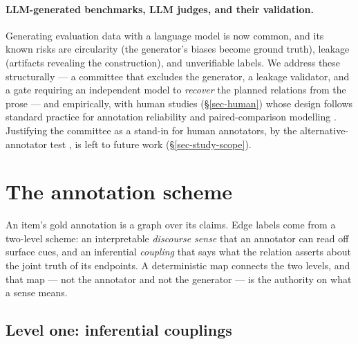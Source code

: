 \paragraph{LLM-generated benchmarks, LLM judges, and their validation.} Generating evaluation data with a
language model is now common, and its known risks are circularity (the generator's biases become ground
truth), leakage (artifacts revealing the construction), and unverifiable labels. We address these
structurally --- a committee that excludes the generator, a leakage validator, and a gate requiring an
independent model to \emph{recover} the planned relations from the prose --- and empirically, with human
studies (\S\ref{sec-human}) whose design follows standard practice for annotation reliability
\citep{krippendorff} and paired-comparison modelling \citep{bradleyterry}. Justifying the committee as a
stand-in for human annotators, by the alternative-annotator test \citep{altannotator}, is left to future
work (\S\ref{sec-study-scope}).

\section{The annotation scheme}
\label{sec-scheme}

An item's gold annotation is a graph over its claims. Edge labels come from a two-level scheme: an
interpretable \emph{discourse sense} that an annotator can read off surface cues, and an inferential
\emph{coupling} that says what the relation asserts about the joint truth of its endpoints. A deterministic
map connects the two levels, and that map --- not the annotator and not the generator --- is the authority
on what a sense means.

\subsection{Level one: inferential couplings}

